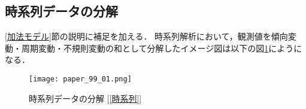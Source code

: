 \documentclass[dvipdfmx]{jreport}
\begin{document}
\subsection{時系列データの分解}
\ref{加法モデル}節の説明に補足を加える．
時系列解析において，観測値を傾向変動・周期変動・不規則変動の和として分解したイメージ図は以下の図\ref{tab:99_01}にようになる．
\begin{figure}[h]
    \begin{center}
        \texttt{[image: paper\_99\_01.png]}
        \caption{時系列データの分解 [\ref{時系列}]} \label{tab:99_01}
    \end{center}
\end{figure}

\end{document}
